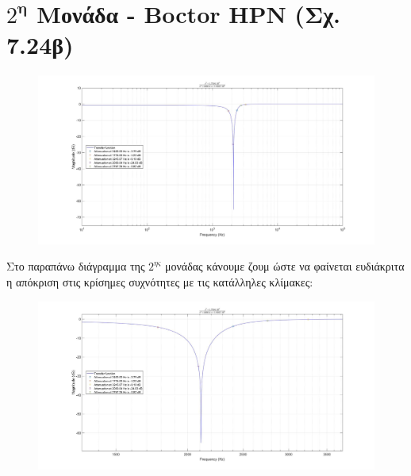 \documentclass{article}
\begin{document}
{{\section*{$2^\textbf{η}$ Μονάδα - Boctor HPN (Σχ. 7.24β)} 
  \begin{figure}[h!]
\centering
 	\advance\leftskip-4cm
  \includegraphics[width=180mm,scale=2]{thema3/matlab1.jpg}
\end{figure} 
\normalsize{}
Στο παραπάνω διάγραμμα της $2^{ης}$ μονάδας κάνουμε ζουμ ώστε να φαίνεται ευδιάκριτα η απόκριση στις κρίσημες συχνότητες με τις κατάλληλες κλίμακες:
\large{}
  \begin{figure}[h!]
\centering
 	\advance\leftskip-1cm
  \includegraphics[width=120mm,scale=2]{thema3/z2.jpg}
\end{figure} 
\newpage
}}
\end{document}
